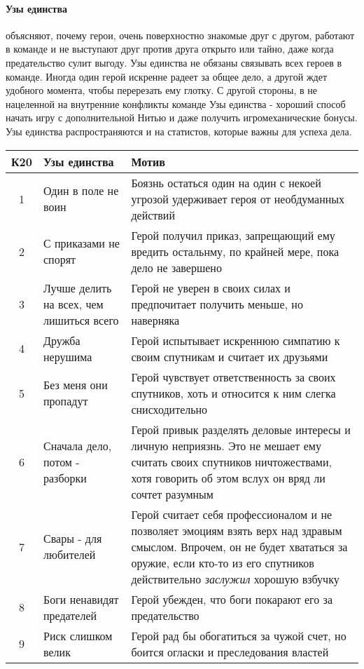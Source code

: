 \paragraph{Узы единства} объясняют, почему герои, очень поверхностно знакомые друг с другом, работают в команде и не выступают друг против друга открыто или тайно, даже когда предательство сулит выгоду. Узы единства не обязаны связывать всех героев в команде. Иногда один герой искренне радеет за общее дело, а другой ждет удобного момента, чтобы перерезать ему глотку. С другой стороны, в не нацеленной на внутренние конфликты команде Узы единства - хороший способ начать игру с дополнительной Нитью и даже получить игромеханические бонусы. Узы единства распространяются и на статистов, которые важны для успеха дела.
\begin{center}
\begin{tabular}{ |c|p{4cm}|p{10cm}| }
\hline
\textbf{К20} & \textbf{Узы единства} & \textbf{Мотив} \\ \hline
1 & Один в поле не воин & Боязнь остаться один на один с некоей угрозой удерживает героя от необдуманных действий \\ \hline
2 & С приказами не спорят & Герой получил приказ, запрещающий ему вредить остальнму, по крайней мере, пока дело не завершено \\ \hline
3 & Лучше делить на всех, чем лишиться всего & Герой не уверен в своих силах и предпочитает получить меньше, но наверняка \\ \hline
4 & Дружба нерушима & Герой испытывает искреннюю симпатию к своим спутникам и считает их друзьями \\ \hline
5 & Без меня они пропадут & Герой чувствует ответственность за своих спутников, хоть и относится к ним слегка снисходительно \\ \hline
6 & Сначала дело, потом - разборки & Герой привык разделять деловые интересы и личную неприязнь. Это не мешает ему считать своих спутников ничтожествами, хотя говорить об этом вслух он вряд ли сочтет разумным \\ \hline
7 & Свары - для любителей & Герой считает себя профессионалом и не позволяет эмоциям взять верх над здравым смыслом. Впрочем, он не будет хвататься за оружие, если кто-то из его спутников действительно \textit{заслужил} хорошую взбучку \\ \hline
8 & Боги ненавидят предателей & Герой убежден, что боги покарают его за предательство \\ \hline
9 & Риск слишком велик & Герой рад бы обогатиться за чужой счет, но боится огласки и преследования властей \\ \hline

\end{tabular}
\end{center}
